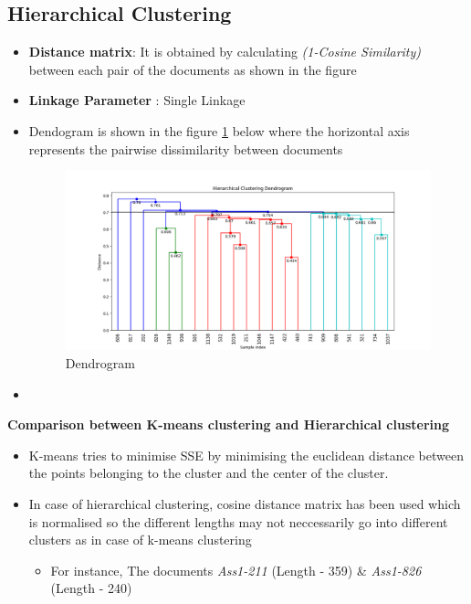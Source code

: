 \documentclass[7pt,a4paper]{article}
\begin{document}
\subsection{Hierarchical Clustering}
\begin{itemize}
\item{\textbf{Distance matrix}: It is obtained by calculating \textit{(1-Cosine Similarity)} between each pair of the documents as shown in the figure}
\item{\textbf{Linkage Parameter} : Single Linkage}
\item{Dendogram is shown in the figure \ref{image-Dendogram} below where the horizontal axis represents the pairwise dissimilarity between documents}

\begin{figure}[h]
\centering
\includegraphics[scale=.40]{dendro}
\caption{Dendrogram}
\label{image-Dendogram}
\end{figure}

\item{}
\end{itemize}

\textbf{Comparison between K-means clustering and Hierarchical clustering}
\begin{itemize}
\item{K-means tries to minimise SSE by minimising the euclidean distance between the points belonging to the cluster and the center of the cluster.}
\item{In case of hierarchical clustering, cosine distance matrix has been used which is normalised so the different lengths may not neccessarily go into different clusters as in case of k-means clustering}
\begin{itemize}
\item{For instance, The documents \textit{Ass1-211} (Length - 359) \& \textit{Ass1-826} (Length - 240) }
\end{itemize}
\end{itemize}
\end{document}
